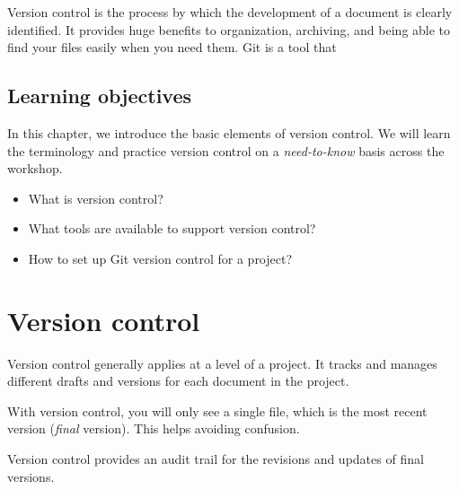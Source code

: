 \documentclass[
  letterpaper,
  DIV=11,
  numbers=noendperiod,
  oneside]{scrreprt}
\begin{document}
Version control is the process by which the development of a document is
clearly identified. It provides huge benefits to organization,
archiving, and being able to find your files easily when you need them.
Git is a tool that

\hypertarget{learning-objectives-2}{%
\subsection{Learning objectives}\label{learning-objectives-2}}

In this chapter, we introduce the basic elements of version control. We
will learn the terminology and practice version control on a
\emph{need-to-know} basis across the workshop.

\begin{itemize}
\item
  What is version control?
\item
  What tools are available to support version control?
\item
  How to set up Git version control for a project?
\end{itemize}

\hypertarget{version-control}{%
\section{Version control}\label{version-control}}

Version control generally applies at a level of a project. It tracks and
manages different drafts and versions for each document in the project.

\begin{tcolorbox}[enhanced jigsaw, coltitle=black, opacityback=0, title=\textcolor{quarto-callout-important-color}{\faExclamation}\hspace{0.5em}{Important}, toprule=.15mm, bottomtitle=1mm, colbacktitle=quarto-callout-important-color!10!white, colframe=quarto-callout-important-color-frame, left=2mm, opacitybacktitle=0.6, bottomrule=.15mm, arc=.35mm, toptitle=1mm, colback=white, titlerule=0mm, breakable, leftrule=.75mm, rightrule=.15mm]

With version control, you will only see a single file, which is the most
recent version (\emph{final} version). This helps avoiding confusion.

\end{tcolorbox}

Version control provides an audit trail for the revisions and updates of
final versions.
\end{document}
